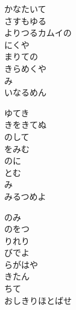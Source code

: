 \documentclass[10pt,b5j]{tarticle} %
\begin{document}
\vspace{1.5em} %
\newcommand{\linespace}{0.5em} %
\newcommand{\blocksize}{0.5\hsize} %
\begin{enumerate} %
    \begin{minipage}[c]{\blocksize}
    
        \vspace{\linespace}
        \item
        かなたいて\\
        さすもゆる\\
        よりつるカムイの\\
        にくや\\
        まりての\\
        きらめくや\\
        み\\
        いなるめん
        
        \vspace{\linespace}
        \item
        ゆてき\\
        きをきてぬ\\
        のして\\
        をみむ\\
        のに\\
        とむ\\
        み\\
        みるつめよ
        
        \vspace{\linespace}
        \item
        のみ\\
        のをつ\\
        りれり\\
        びでよ\\
        らがはや\\
        きたん\\
        ちて\\
        おしきりほとばせ
    
    \end{minipage}
\end{enumerate} %
\end{document}
